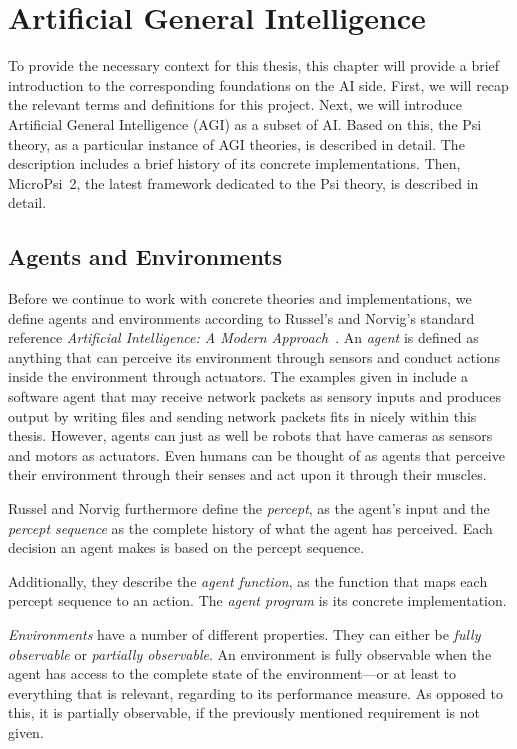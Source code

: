 \chapter{Artificial General Intelligence}
\label{chap:2}
To provide the necessary context for this thesis, this chapter will provide a brief introduction to the corresponding foundations on the AI side. First, we will recap the relevant terms and definitions for this project. Next, we will introduce Artificial General Intelligence (AGI) as a subset of AI. Based on this, the Psi theory, as a particular instance of AGI theories, is described in detail. The description includes a brief history of its concrete implementations. Then, MicroPsi~2, the latest framework dedicated to the Psi theory, is described in detail.

    \section{Agents and Environments} 

Before we continue to work with concrete theories and implementations, we define agents and environments according to Russel's and Norvig's standard reference \emph{Artificial Intelligence: A Modern Approach}~\cite{russell2009artificial}. An \emph{agent} is defined as anything that can perceive its environment through sensors and conduct actions inside the environment through actuators. The examples given in \cite{russell2009artificial} include a software agent that may receive network packets as sensory inputs and produces output by writing files and sending network packets fits in nicely within this thesis. However, agents can just as well be robots that have cameras as sensors and motors as actuators. Even humans can be thought of as agents that perceive their environment through their senses and act upon it through their muscles.

Russel and Norvig furthermore define the \emph{percept}, as the agent's input and the \emph{percept sequence} as the complete history of what the agent has perceived. Each decision an agent makes is based on the percept sequence.

Additionally, they describe the \emph{agent function}, as the function that maps each percept sequence to an action. The \emph{agent program} is its concrete implementation.

\emph{Environments} have a number of different properties. They can either be \emph{fully observable} or \emph{partially observable}. An environment is fully observable when the agent has access to the complete state of the environment---or at least to everything that is relevant, regarding to its performance measure. As opposed to this, it is partially observable, if the previously mentioned requirement is not given.

